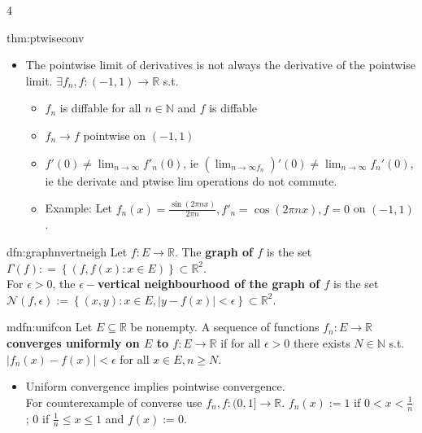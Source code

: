\documentclass[landscape, 8pt]{extarticle}
\begin{document}
\begin{multicols*}{4}
\begin{thm}{thm:ptwiseconv}{ }
\begin{itemize}[label=*]
\begin{itemize}
				\item Example: Let $f_n(x) := \sqrt{x^2 + \frac{1}{n}}$, limit is not diffable at $0$.
			\end{itemize}
			\item The pointwise limit of derivatives is not always the derivative of the pointwise limit. $\exists f_n, f : (-1, 1) \to \mathbb{R}$ s.t.
			\begin{itemize}
				\item $f_n$ is diffable for all $n \in \mathbb{N}$ and $f$ is diffable
				\item $f_n \to f$ pointwise on $(-1, 1)$
				\item $f'(0) \ne \lim_{n\to \infty}f'_n(0)$, ie $\left(\lim_{n\to \infty f_n}\right)'(0) \ne \lim_{n\to \infty}f_n'(0)$, ie the derivate and ptwise lim operations do not commute.
				\item Example: Let $f_n(x) = \frac{\sin(2 \pi n x)}{2 \pi n}, f'_n = \cos(2\pi n x), f = 0$ on $(-1, 1)$.
			\end{itemize}
		\end{itemize}
		
		\end{thm}
		
		
		\begin{dfn}{dfn:graphnvertneigh}{ }
		Let $f: E \to \mathbb{R}$. The \textbf{graph of $f$} is the set $\Gamma(f) : = \left\{(f, f(x) : x\in E)\right\} \subset \mathbb{R}^2$.\\
		For $ \epsilon > 0$, the \textbf{$\epsilon-$vertical neighbourhood of the graph of $f$} is the set \\
		$\mathcal{N}(f,\epsilon) := \left\{(x, y) : x\in E, \left|y-f(x)\right| <\epsilon\right\} \subset \mathbb{R}^2$.
		
		\end{dfn}
		
		
		\begin{mdfn}{mdfn:unifcon}{ }
		Let $E \subseteq \mathbb{R}$ be nonempty. A sequence of functions $f_n: E \to \mathbb{R}$ \textbf{converges uniformly on $E$ to $f: E \to \mathbb{R}$} if for all $\epsilon > 0$ there exists $N\in \mathbb{N}$ s.t. $\left|f_n(x) - f(x)\right| <\epsilon$ for all $x\in E, n \ge N$.
		\begin{itemize}
			\item Uniform convergence implies pointwise convergence. \\
			For counterexample of converse use $f_n, f: (0, 1]  \to \mathbb{R}$. $f_n(x) := 1 $ if $0 < x < \frac{1}{n}$; $0$ if $\frac{1}{n} \le x \le 1$ and $f(x) :=0$.
		\end{itemize}
		

\end{mdfn}
\end{multicols*}
\end{document}
